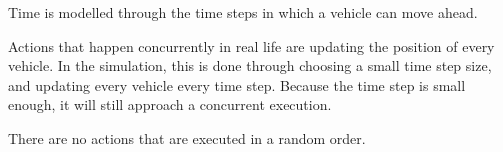 Time is modelled through the time steps in which a vehicle can move ahead. 

Actions that happen concurrently in real life are updating the position of every vehicle. In the simulation, this is done through choosing a small time step size, and updating every vehicle every time step. Because the time step is small enough, it will still approach a concurrent execution.


There are no actions that are executed in a random order.
